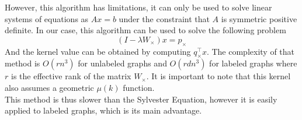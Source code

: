 \documentclass{article}
\theoremstyle{definition}
\begin{document}
However, this algorithm has limitations, it can only be used to solve linear systems of equations as $Ax=b$ under the constraint that $A$ is symmetric positive definite.
In our case, this algorithm can be used to solve the following problem 
\begin{equation}
	(I-\lambda W_{\times})x=p_{\times}
\end{equation}
And the kernel value can be obtained by computing $q_{\times}^{\top}x$. The complexity of that method is $O(rn^3)$ for unlabeled graphs and $O(rdn^3)$ for labeled graphs where $r$ is the effective rank of the matrix $W_{\times}$. It is important to note that this kernel also assumes a geometric $\mu(k)$ function. \\
This method is thus slower than the Sylvester Equation, however it is easily applied to labeled graphs, which is its main advantage.
\end{document}
